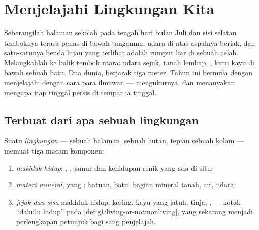 \chapter{Menjelajahi Lingkungan Kita}\label{ch:g6:exploring-our-environment}

Seberangilah halaman sekolah pada tengah hari bulan Juli dan sisi
selatan temboknya terasa panas di bawah tanganmu, udara di atas
aspalnya beriak, dan satu-satunya benda hijau yang terlihat adalah
rumput liar di sebuah celah. Melangkahlah ke balik tembok utara: udara
sejuk, tanah lembap, , kutu kayu di bawah sebuah batu. Dua dunia,
berjarak tiga meter. Tahun ini bermula dengan menjelajahi 
dengan cara para ilmuwan --- mengukurnya, dan menanyakan mengapa tiap
 tinggal persis di tempat ia tinggal.

\section{Terbuat dari apa sebuah lingkungan}

\begin{definition}\label{def:g6:exploring-our-environment:components}
Suatu \emph{lingkungan} --- sebuah halaman, sebuah
hutan, tepian sebuah kolam --- memuat tiga macam komponen:
\begin{enumerate}
  \item \emph{makhluk hidup}: , ,
        jamur dan kehidupan renik yang ada di situ;
  \item \emph{materi mineral}, yang : batuan, batu, bagian mineral tanah, air, udara;
  \item \emph{jejak dan sisa} makhluk hidup:  kering, kayu yang
        jatuh, tinja, ,  --- kotak ``dahulu
        hidup'' pada \cref{def:g1:living-or-not:nonliving}, yang
        sekarang menjadi perlengkapan petunjuk bagi sang penjelajah.
\end{enumerate}
\end{definition}


